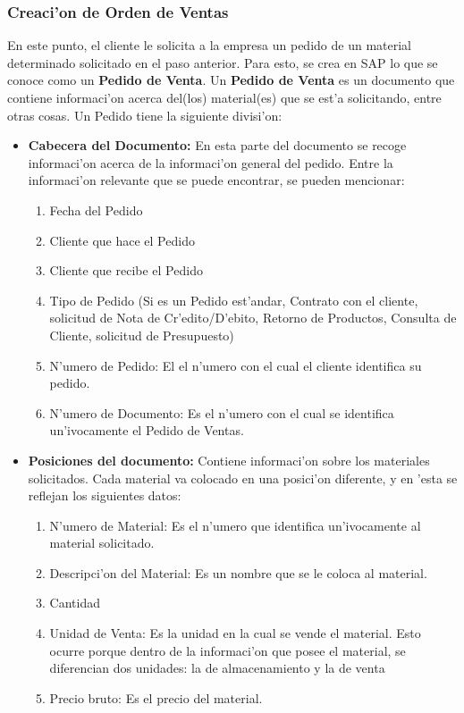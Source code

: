 \subsubsection*{Creaci'on de Orden de Ventas}
	En este punto, el cliente le solicita a la empresa un pedido de un material determinado solicitado en el paso anterior. Para esto, se crea en SAP lo que se conoce como un \textbf{Pedido de Venta}. Un \textbf{Pedido de Venta} es un documento que contiene informaci'on acerca del(los) material(es) que se est'a solicitando, entre otras cosas. Un Pedido tiene la siguiente divisi'on:
\begin{itemize}
\item \textbf{Cabecera del Documento:} En esta parte del documento se recoge informaci'on acerca de la informaci'on general del pedido. Entre la informaci'on relevante que se puede encontrar, se pueden mencionar: 
\begin{enumerate}
\item Fecha del Pedido
\item Cliente que hace el Pedido
\item Cliente que recibe el Pedido
\item Tipo de Pedido (Si es un Pedido est'andar, Contrato con el cliente, solicitud de Nota de Cr'edito/D'ebito, Retorno de Productos, Consulta de Cliente, solicitud de Presupuesto)
\item N'umero de Pedido: El el n'umero con el cual el cliente identifica su pedido.
\item N'umero de Documento: Es el n'umero con el cual se identifica un'ivocamente el Pedido de Ventas.
\end{enumerate}
\item \textbf{Posiciones del documento:} Contiene informaci'on sobre los materiales solicitados. Cada material va colocado en una posici'on diferente, y en 'esta se reflejan los siguientes datos:
\begin{enumerate}
\item N'umero de Material: Es el n'umero que identifica un'ivocamente al material solicitado.
\item Descripci'on del Material: Es un nombre que se le coloca al material.
\item Cantidad
\item Unidad de Venta: Es la unidad en la cual se vende el material. Esto ocurre porque dentro de la informaci'on que posee el material, se diferencian dos unidades: la de almacenamiento y la de venta
\item Precio bruto: Es el precio del material.
\end{enumerate}
\end{itemize}


